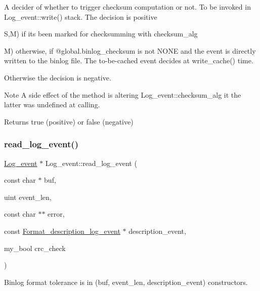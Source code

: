 A decider of whether to trigger checksum computation or not. To be invoked in Log\+\_\+event\+::write() stack. The decision is positive

S,M) if it\textquotesingle{}s been marked for checksumming with {\ttfamily checksum\+\_\+alg} 

M) otherwise, if @global.\+binlog\+\_\+checksum is not N\+O\+NE and the event is directly written to the binlog file. The to-\/be-\/cached event decides at {\ttfamily write\+\_\+cache()} time.

Otherwise the decision is negative.

\begin{DoxyNote}{Note}
A side effect of the method is altering Log\+\_\+event\+::checksum\+\_\+alg it the latter was undefined at calling.
\end{DoxyNote}
\begin{DoxyReturn}{Returns}
true (positive) or false (negative) 
\end{DoxyReturn}
\mbox{\label{classLog__event_a5b13b5e395cd4ef015dc874af6128307}} 
\subsubsection{\texorpdfstring{read\+\_\+log\+\_\+event()}{read\_log\_event()}}
{\footnotesize\ttfamily \mbox{\hyperlink{classLog__event}{Log\+\_\+event}} $\ast$ Log\+\_\+event\+::read\+\_\+log\+\_\+event (\begin{DoxyParamCaption}\item[{const char $\ast$}]{buf,  }\item[{uint}]{event\+\_\+len,  }\item[{const char $\ast$$\ast$}]{error,  }\item[{const \mbox{\hyperlink{classFormat__description__log__event}{Format\+\_\+description\+\_\+log\+\_\+event}} $\ast$}]{description\+\_\+event,  }\item[{my\+\_\+bool}]{crc\+\_\+check }\end{DoxyParamCaption})\hspace{0.3cm}{\ttfamily [static]}}

Binlog format tolerance is in (buf, event\+\_\+len, description\+\_\+event) constructors. \mbox{\label{classLog__event_a65dc0fdcdcc26bdf0289e0fec9cd9337}} 
